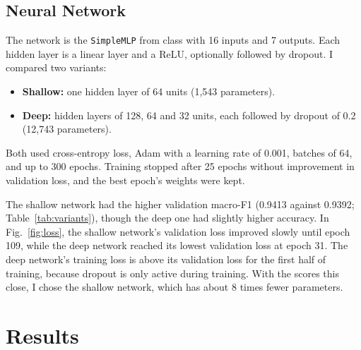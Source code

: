 \documentclass[conference,letterpaper]{IEEEtran}
\begin{document}
\subsection{Neural Network}
The network is the \texttt{SimpleMLP} from class with 16 inputs and 7 outputs. Each hidden layer is a linear layer and a ReLU, optionally followed by dropout. I compared two variants:
\begin{itemize}
\item \textbf{Shallow:} one hidden layer of 64 units (1,543 parameters).
\item \textbf{Deep:} hidden layers of 128, 64 and 32 units, each followed by dropout of 0.2 (12,743 parameters).
\end{itemize}
Both used cross-entropy loss, Adam \cite{kingma2015adam} with a learning rate of 0.001, batches of 64, and up to 300 epochs. Training stopped after 25 epochs without improvement in validation loss, and the best epoch's weights were kept.

\begin{table}[!t]
\centering
\caption{MLP variants on the validation set. The chosen variant is in bold.}
\label{tab:variants}
\end{table}

The shallow network had the higher validation macro-F1 (0.9413 against 0.9392; Table~\ref{tab:variants}), though the deep one had slightly higher accuracy. In Fig.~\ref{fig:loss}, the shallow network's validation loss improved slowly until epoch 109, while the deep network reached its lowest validation loss at epoch 31. The deep network's training loss is above its validation loss for the first half of training, because dropout is only active during training. With the scores this close, I chose the shallow network, which has about 8 times fewer parameters.

\section{Results}
\end{document}
